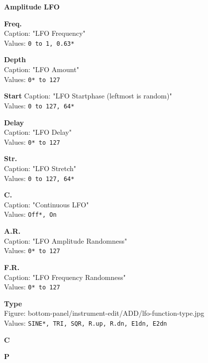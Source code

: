 \documentclass[
 11pt,
 twoside,
 a4paper,
 headinclude,
 footinclude,
 final                                 %
]{article}
\begin{document}
\begin{enumber}
\begin{enumber}
\begin{enumber}
\begin{enumber}
            \item \textbf{Amplitude LFO}
            \begin{enumber}
               \item \textbf{Freq.} \\
                  Caption: "LFO Frequency" \\
                  Values: \texttt{0 to 1, 0.63*}
               \item \textbf{Depth} \\
                  Caption: "LFO Amount" \\
                  Values: \texttt{0* to 127}
               \item \textbf{Start}
                  Caption: "LFO Startphase (leftmost is random)" \\
                  Values: \texttt{0 to 127, 64*}
               \item \textbf{Delay} \\
                  Caption: "LFO Delay" \\
                  Values: \texttt{0* to 127}
               \item \textbf{Str.} \\
                  Caption: "LFO Stretch" \\
                  Values: \texttt{0 to 127, 64*}
               \item \textbf{C.} \\
                  Caption: "Continuous LFO" \\
                  Values: \texttt{Off*, On}
               \item \textbf{A.R.} \\
                  Caption: "LFO Amplitude Randomness" \\
                  Values: \texttt{0* to 127}
               \item \textbf{F.R.} \\
                  Caption: "LFO Frequency Randomness" \\
                  Values: \texttt{0* to 127}
               \item \textbf{Type} \\
                  Figure: bottom-panel/instrument-edit/ADD/lfo-function-type.jpg \\
                  Values: \texttt{SINE*, TRI, SQR, R.up, R.dn, E1dn, E2dn}
               \item \textbf{C}
               \item \textbf{P}
            \end{enumber}


\end{enumber}
\end{enumber}
\end{enumber}
\end{enumber}
\end{document}
